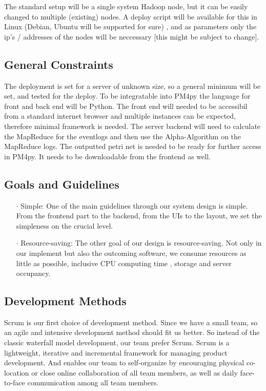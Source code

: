 \documentclass[runningheads]{llncs}
\begin{document}
\noindent
The standard setup will be a single system Hadoop node, but it can be easily changed to multiple (existing) nodes. A deploy script will be available for this in Linux (Debian, Ubuntu will be supported for sure) , and as parameters only the ip's / addresses of the nodes will be neccessary [this might be subject to change].

\subsection{General Constraints}

The deployment is set for a server of unknown size, so a general minimum will be set, and tested for the deploy. To be integratable into PM4py the language for front and back end will be Python. The front end will needed to be accessibil from a standard internet browser and multiple instances can be expected, therefore minimal framework is needed. The server backend will need to calculate the MapReduce for the eventlogs and then use the Alpha-Algorithm on the MapReduce logs. The outputted petri net is needed to be ready for further access in PM4py. It needs to be downloadable from the frontend as well.

\subsection{Goals and Guidelines}

\begin{itemize}
	\item[\Large $\cdot$] Simple:
	One of the main guidelines through our system design is simple. From the frontend part to the backend, from the UIs to the layout, we set the simpleness on the crucial level.\\
	\item[\Large $\cdot$] Resource-saving:
	The other goal of our design is resource-saving. Not only in our implement but also the outcoming software, we consume resources as little as possible, inclusive CPU computing time , storage and server occupancy.
\end{itemize}

\subsection{Development Methods}

Scrum is our first choice of development method. Since we have a small team, so an agile and intensive development method should fit us better. So instead of the classic waterfall model development, our team prefer Scrum. Scrum is a lightweight, iterative and incremental framework for managing product development. And enables our team to self-organize by encouraging physical co-location or close online collaboration of all team members, as well as daily face-to-face communication among all team members.\cite{wiki:xxx}
\end{document}
